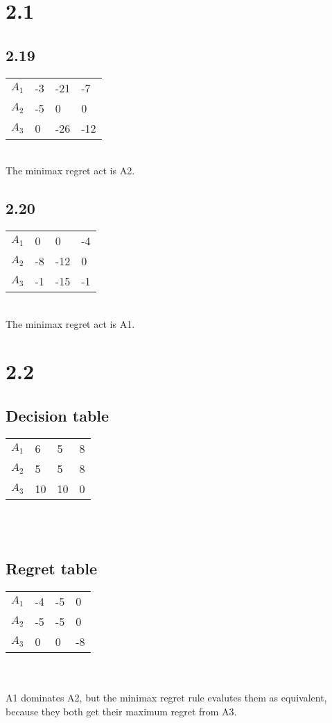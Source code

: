 \documentclass{article}
\begin{document}
\section*{2.1}

\subsection*{2.19}
\begin{tabular}{l|l|l|l|}
\cline{2-4}
  $A_{1}$ & -3 & -21 & -7 \\ \cline{2-4}
  $A_{2}$ & -5 & 0 & 0 \\ \cline{2-4} 
  $A_{3}$ & 0 & -26 & -12 \\ \cline{2-4} 
\end{tabular}\\ 
The minimax regret act is A2. \\

\subsection*{2.20}
\begin{tabular}{l|l|l|l|}
\cline{2-4}
  $A_{1}$ & 0 & 0 & -4 \\ \cline{2-4}
  $A_{2}$ & -8 & -12 & 0 \\ \cline{2-4} 
  $A_{3}$ & -1 & -15 & -1 \\ \cline{2-4} 
\end{tabular}\\
The minimax regret act is A1. \\

\section*{2.2}

\subsection*{Decision table}
\begin{tabular}{l|l|l|l|}
\cline{2-4}
  $A_{1}$ & 6 & 5 & 8 \\ \cline{2-4}
  $A_{2}$ & 5 & 5 & 8 \\ \cline{2-4} 
  $A_{3}$ & 10 & 10 & 0 \\ \cline{2-4} 
\end{tabular}\\ \\

\subsection*{Regret table}
\begin{tabular}{l|l|l|l|}
\cline{2-4}
  $A_{1}$ & -4 & -5 & 0 \\ \cline{2-4}
  $A_{2}$ & -5 & -5 & 0 \\ \cline{2-4} 
  $A_{3}$ & 0 & 0 & -8 \\ \cline{2-4} 
\end{tabular}\\ 
\\A1 dominates A2, but the minimax regret rule evalutes them as equivalent, because they both get their maximum regret from A3.
\end{document}
